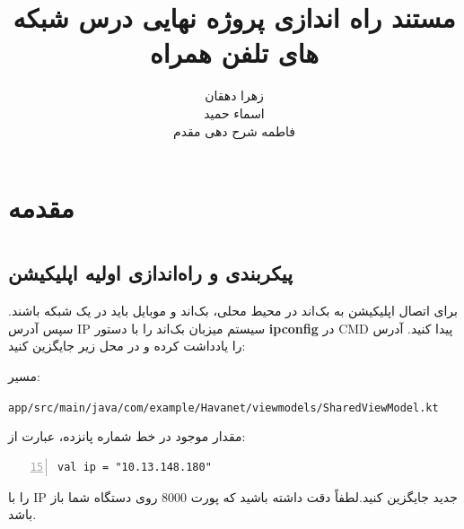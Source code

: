 \documentclass{report}
\title{مستند راه اندازی پروژه نهایی درس شبکه های تلفن همراه}
\author{زهرا دهقان\\اسماء حمید\\فاطمه شرح دهی مقدم}
\begin{document}
\Godpage
\maketitle
{}
\tableofcontents


\chapter{مقدمه}








\chapter{ }

\chapter{ }

\chapter{ }

\section{پیکربندی و راه‌اندازی اولیه اپلیکیشن}

برای اتصال اپلیکیشن به بک‌اند در محیط محلی، بک‌اند و موبایل باید در یک شبکه باشند. سپس آدرس IP سیستم میزبان بک‌اند را با دستور \textbf{ipconfig} در CMD پیدا کنید. آدرس  را یادداشت کرده و در محل زیر جایگزین کنید:

	مسیر: \\
	\begin{latin}
		\texttt{app/src/main/java/com/example/Havanet/viewmodels/SharedViewModel.kt}\\
	\end{latin}
	مقدار موجود در خط شماره پانزده، عبارت از:
\begin{latin}
\begin{lstlisting}[mathescape=true, numbers=left, firstnumber=15]
val ip = "10.13.148.180"
\end{lstlisting}
\end{latin}
	را با IP جدید جایگزین کنید.لطفاً دقت داشته باشید که پورت 8000 روی دستگاه شما باز باشد.

	
\end{document}
